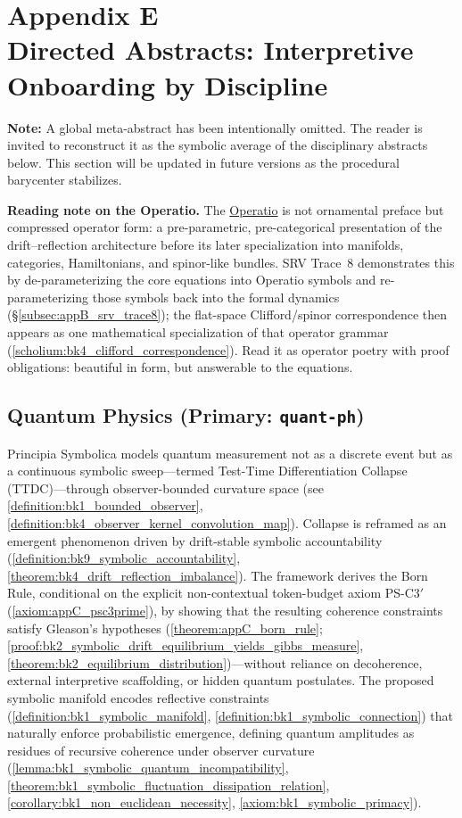 \chapter*{Appendix E \\ Directed Abstracts: Interpretive Onboarding by Discipline}
\label{sec:appE_directed_abstracts}

\noindent
\textbf{Note:} A global meta-abstract has been intentionally omitted. The reader is invited to reconstruct it as the symbolic average of the disciplinary abstracts below. This section will be updated in future versions as the procedural barycenter stabilizes.

\medskip
\noindent
\textbf{Reading note on the Operatio.} The \hyperref[sec:bk1_operatio]{Operatio} is not ornamental preface but compressed operator form: a pre-parametric, pre-categorical presentation of the drift--reflection architecture before its later specialization into manifolds, categories, Hamiltonians, and spinor-like bundles. SRV Trace~8 demonstrates this by de-parameterizing the core equations into Operatio symbols and re-parameterizing those symbols back into the formal dynamics (\S\ref{subsec:appB_srv_trace8}); the flat-space Clifford/spinor correspondence then appears as one mathematical specialization of that operator grammar (\ref{scholium:bk4_clifford_correspondence}). Read it as operator poetry with proof obligations: beautiful in form, but answerable to the equations.

\section*{Quantum Physics (Primary: \texttt{quant-ph})}
\label{sec:appE_quantum_physics}
Principia Symbolica models quantum measurement not as a discrete event but as a continuous symbolic sweep—termed Test-Time Differentiation Collapse (TTDC)—through observer-bounded curvature space (see \ref{definition:bk1_bounded_observer}, \ref{definition:bk4_observer_kernel_convolution_map}). Collapse is reframed as an emergent phenomenon driven by drift-stable symbolic accountability (\ref{definition:bk9_symbolic_accountability}, \ref{theorem:bk4_drift_reflection_imbalance}). The framework derives the Born Rule, conditional on the explicit non-contextual token-budget axiom PS-C3$'$ (\ref{axiom:appC_psc3prime}), by showing that the resulting coherence constraints satisfy Gleason's hypotheses (\ref{theorem:appC_born_rule}; \ref{proof:bk2_symbolic_drift_equilibrium_yields_gibbs_measure}, \ref{theorem:bk2_equilibrium_distribution})---without reliance on decoherence, external interpretive scaffolding, or hidden quantum postulates. The proposed symbolic manifold encodes reflective constraints (\ref{definition:bk1_symbolic_manifold}, \ref{definition:bk1_symbolic_connection}) that naturally enforce probabilistic emergence, defining quantum amplitudes as residues of recursive coherence under observer curvature (\ref{lemma:bk1_symbolic_quantum_incompatibility}, \ref{theorem:bk1_symbolic_fluctuation_dissipation_relation}, \ref{corollary:bk1_non_euclidean_necessity}, \ref{axiom:bk1_symbolic_primacy}).

